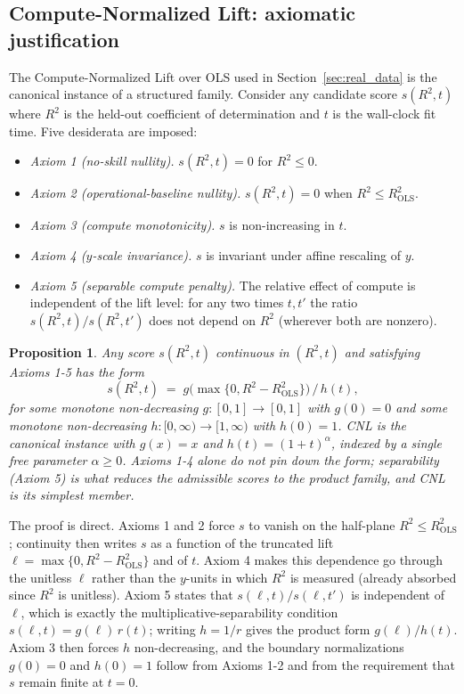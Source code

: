 \documentclass{article}
\newtheorem{proposition}{Proposition}
\begin{document}
\subsection{Compute-Normalized Lift: axiomatic justification}
\label{sec:app_cnl_axioms}

The Compute-Normalized Lift over OLS used in Section~\ref{sec:real_data} is the canonical instance of a structured family. Consider any candidate score $s(R^2, t)$ where $R^2$ is the held-out coefficient of determination and $t$ is the wall-clock fit time. Five desiderata are imposed:
\begin{itemize}
\item \emph{Axiom 1 (no-skill nullity).} $s(R^2, t) = 0$ for $R^2 \le 0$.
\item \emph{Axiom 2 (operational-baseline nullity).} $s(R^2, t) = 0$ when $R^2 \le R^2_{\mathrm{OLS}}$.
\item \emph{Axiom 3 (compute monotonicity).} $s$ is non-increasing in $t$.
\item \emph{Axiom 4 ($y$-scale invariance).} $s$ is invariant under affine rescaling of $y$.
\item \emph{Axiom 5 (separable compute penalty).} The relative effect of compute is independent of the lift level: for any two times $t, t'$ the ratio $s(R^2, t) / s(R^2, t')$ does not depend on $R^2$ (wherever both are nonzero).
\end{itemize}

\begin{proposition}
\label{prop:cnl_uniqueness}
Any score $s(R^2, t)$ continuous in $(R^2, t)$ and satisfying Axioms 1-5 has the form
\[
   s(R^2, t) \;=\; g\!\bigl(\max\{0, R^2 - R^2_{\mathrm{OLS}}\}\bigr) \,/\, h(t) ,
\]
for some monotone non-decreasing $g: [0, 1] \to [0, 1]$ with $g(0) = 0$ and some monotone non-decreasing $h: [0, \infty) \to [1, \infty)$ with $h(0) = 1$. CNL is the canonical instance with $g(x) = x$ and $h(t) = (1+t)^\alpha$, indexed by a single free parameter $\alpha \ge 0$. Axioms 1-4 alone do not pin down the form; separability (Axiom 5) is what reduces the admissible scores to the product family, and CNL is its simplest member.
\end{proposition}

The proof is direct. Axioms 1 and 2 force $s$ to vanish on the half-plane $R^2 \le R^2_{\mathrm{OLS}}$; continuity then writes $s$ as a function of the truncated lift $\ell = \max\{0, R^2 - R^2_{\mathrm{OLS}}\}$ and of $t$. Axiom 4 makes this dependence go through the unitless $\ell$ rather than the $y$-units in which $R^2$ is measured (already absorbed since $R^2$ is unitless). Axiom 5 states that $s(\ell, t) / s(\ell, t')$ is independent of $\ell$, which is exactly the multiplicative-separability condition $s(\ell, t) = g(\ell)\,r(t)$; writing $h = 1/r$ gives the product form $g(\ell)/h(t)$. Axiom 3 then forces $h$ non-decreasing, and the boundary normalizations $g(0) = 0$ and $h(0) = 1$ follow from Axioms 1-2 and from the requirement that $s$ remain finite at $t = 0$.
\end{document}
